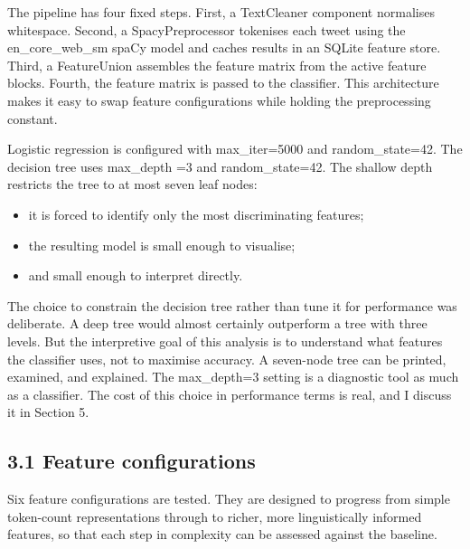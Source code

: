\documentclass[12pt]{article}
\begin{document}
The pipeline has four fixed steps. First, a TextCleaner component normalises whitespace. Second, a SpacyPreprocessor tokenises each tweet using the en\_core\_web\_sm spaCy model and caches results in an SQLite feature store. Third, a FeatureUnion assembles the feature matrix from the active feature blocks. Fourth, the feature matrix is passed to the classifier. This architecture makes it easy to swap feature configurations while holding the preprocessing constant.



Logistic regression is configured with max\_iter=5000 and random_state=42. The decision tree uses max\_depth =3 and random\_state=42. The shallow depth restricts the tree to at most seven leaf nodes:

\begin{itemize}

  \item it is forced to identify only the most discriminating features;

  \item the resulting model is small enough to visualise;

  \item and small enough to interpret directly.

\end{itemize}



The choice to constrain the decision tree rather than tune it for performance was deliberate. A deep tree would almost certainly outperform a tree with three levels. But the interpretive goal of this analysis is to understand what features the classifier uses, not to maximise accuracy. A seven-node tree can be printed, examined, and explained. The max\_depth=3 setting is a diagnostic tool as much as a classifier. The cost of this choice in performance terms is real, and I discuss it in Section 5.



\subsection*{3.1 Feature configurations}



Six feature configurations are tested. They are designed to progress from simple token-count representations through to richer, more linguistically informed features, so that each step in complexity can be assessed against the baseline.
\end{document}
